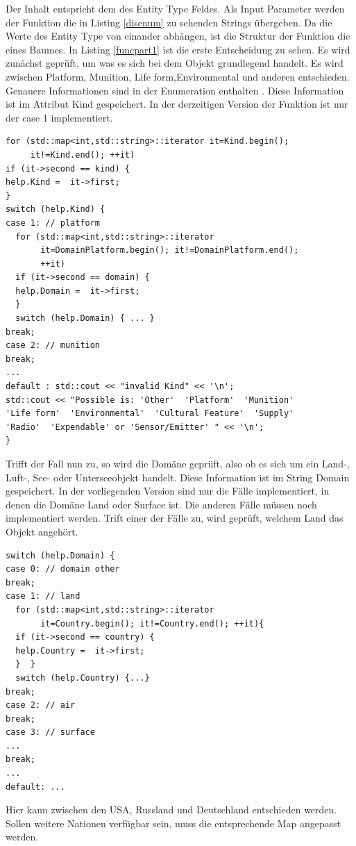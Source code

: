 Der Inhalt entspricht dem  des \glqq Entity Type\grqq{} Feldes. Als Input Parameter werden der Funktion die in Listing  \ref{disenum} zu sehenden Strings übergeben. Da die Werte des \glqq Entity Type\grqq{}  von einander abhängen, ist die Struktur der Funktion die eines Baumes.  In Listing \ref{funcpart1} ist die erste Entscheidung zu sehen. Es wird zunächst geprüft, um was es sich bei dem Objekt grundlegend handelt. Es wird zwischen \glqq Platform\grqq{}, \glqq Munition\grqq{}, \glqq Life form\grqq{},\glqq Environmental\grqq{} und anderen entschieden. Genauere Informationen sind in der Enumeration enthalten \cite{Shanks.}. Diese Information ist im Attribut \glqq Kind \grqq{} gespeichert. In der derzeitigen Version der Funktion ist nur der \glqq case 1\grqq{} implementiert. 
 \begin{lstlisting}[caption = Funktion \glqq getDISEntityType()\grqq{} Teil 1  ,label= funcpart1]
for (std::map<int,std::string>::iterator it=Kind.begin(); 
     it!=Kind.end(); ++it)
if (it->second == kind) {
help.Kind =  it->first;
}
switch (help.Kind) {
case 1: // platform
  for (std::map<int,std::string>::iterator 
       it=DomainPlatform.begin(); it!=DomainPlatform.end();
       ++it)
  if (it->second == domain) {
  help.Domain =  it->first;
  }
  switch (help.Domain) { ... }
break;
case 2: // munition
break;
...
default : std::cout << "invalid Kind" << '\n';
std::cout << "Possible is: 'Other'  'Platform'  'Munition'
'Life form'  'Environmental'  'Cultural Feature'  'Supply'
'Radio'  'Expendable' or 'Sensor/Emitter' " << '\n';
}
\end{lstlisting}
 Trifft der Fall nun zu, so wird die Domäne geprüft, also ob es sich um ein Land-, Luft-, See- oder Unterseeobjekt handelt. Diese Information ist im String \glqq Domain \grqq{} gespeichert. In der vorliegenden Version sind nur die Fälle implementiert, in denen die Domäne Land oder Surface ist. Die anderen Fälle müssen noch implementiert werden. Trift einer der Fälle zu, wird geprüft, welchem Land das Objekt angehört. 
 \begin{lstlisting}[caption = Funktion \glqq getDISEntityType()\grqq{} Teil 2  ,label= funcpart2]
switch (help.Domain) {
case 0: // domain other
break;
case 1: // land
  for (std::map<int,std::string>::iterator 
       it=Country.begin(); it!=Country.end(); ++it){
  if (it->second == country) {
  help.Country =  it->first;
  }  }
  switch (help.Country) {...}
break;
case 2: // air
break;
case 3: // surface
...
break;
...
default: ...
 \end{lstlisting}
 Hier kann zwischen den USA, Russland und Deutschland entschieden werden. Sollen weitere Nationen verfügbar sein, muss die entsprechende Map angepasst werden. 
